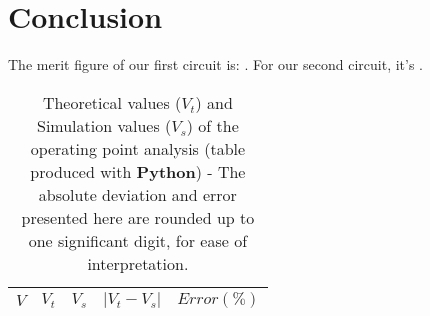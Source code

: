 \section{Conclusion}
\label{sec:conclusion}


The merit figure of our first circuit is: . For our second circuit, it's .


\begin{table}[H]
  \centering
  \begin{tabular}{|c|c|c|c|c|}
    \hline
        $V$ & $V_t$ & $V_s$ & $|V_t-V_s|$ & $Error (\%)$ \\
        \hline
        \hline
        
        \hline
  \end{tabular}
  \caption{Theoretical values ($V_t$) and Simulation values ($V_s$) of the operating point analysis (table produced with {\bf Python})  - The absolute deviation and error presented here are rounded up to one significant digit, for ease of interpretation.}
  \label{error1_res}
\end{table}

